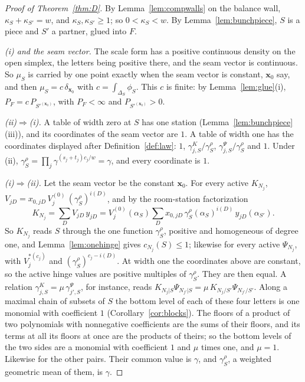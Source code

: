 \documentclass[11pt]{article}
\theoremstyle{plain}
\theoremstyle{definition}
\theoremstyle{remark}
\newcommand{\bx}{\mathbf x}
\begin{document}
\begin{proof}[Proof of Theorem~\ref{thm:D}]
By Lemma~\ref{lem:compwalls} on the balance wall, $\kappa_S+\kappa_{S'}=w$, and $\kappa_S,\kappa_{S'}\ge1$; so $0<\kappa_S<w$. By Lemma~\ref{lem:bunchpiece}, $S$ is a piece and $S'$ a partner, glued into $F$.

\emph{(i) and the seam vector.} The scale form has a positive continuous density on the open simplex, the letters being positive there, and the seam vector is continuous. So $\mu_S$ is carried by one point exactly when the seam vector is constant, $\bx_0$ say, and then $\mu_S=c\,\delta_{\bx_0}$ with $c=\int_{\Delta_S}\phi_S$. This $c$ is finite: by Lemma~\ref{lem:glue}(i), $P_F=c\,P_{S'^{(\bx_0)}}$, with $P_F<\infty$ and $P_{S'^{(\bx_0)}}>0$.

\emph{(ii)$\Rightarrow$(i).} A table of width zero at $S$ has one station (Lemma~\ref{lem:bunchpiece}(iii)), and its coordinates of the seam vector are $1$. A table of width one has the coordinates displayed after Definition~\ref{def:law}: $1$, $\gamma^K_{j,S}/\gamma^\rho_S$, $\gamma^\Psi_{j,S}/\gamma^\rho_S$ and $1$. Under (ii), $\gamma^\rho_S=\prod_j\gamma^{(s_j+t_j)c_j/w}=\gamma$, and every coordinate is $1$.

\emph{(i)$\Rightarrow$(ii).} Let the seam vector be the constant $\bx_0$. For every active $K_{N_j}$, $V_{jD}=x_{0,jD}\,V^{(0)}_j\,(\gamma^\rho_S)^{i(D)}$, and by the room-station factorization
\[
K_{N_j}=\sum_DV_{jD}\,y_{jD}=V^{(0)}_j(\alpha_S)\sum_Dx_{0,jD}\,\gamma^\rho_S(\alpha_S)^{i(D)}\,y_{jD}(\alpha_{S'}).
\]
So $K_{N_j}$ reads $S$ through the one function $\gamma^\rho_S$, positive and homogeneous of degree one, and Lemma~\ref{lem:onehinge} gives $c_{N_j}(S)\le1$; likewise for every active $\Psi_{N_j}$, with $V^{\ast(c_j)}_j$ and $(\gamma^\rho_S)^{c_j-i(D)}$. At width one the coordinates above are constant, so the active hinge values are positive multiples of $\gamma^\rho_S$. They are then equal. A relation $\gamma^K_{j,S}=\mu\,\gamma^\Psi_{j',S}$, for instance, reads $K_{N_j|S}\Psi_{N_{j'}|S}=\mu\,K_{N_j/S'}\Psi_{N_{j'}/S'}$. Along a maximal chain of subsets of $S$ the bottom level of each of these four letters is one monomial with coefficient $1$ (Corollary~\ref{cor:blocks}). The floors of a product of two polynomials with nonnegative coefficients are the sums of their floors, and its terms at all its floors at once are the products of theirs; so the bottom levels of the two sides are a monomial with coefficient $1$ and $\mu$ times one, and $\mu=1$. Likewise for the other pairs. Their common value is $\gamma$, and $\gamma^\rho_S$, a weighted geometric mean of them, is $\gamma$.


\end{proof}
\end{document}
